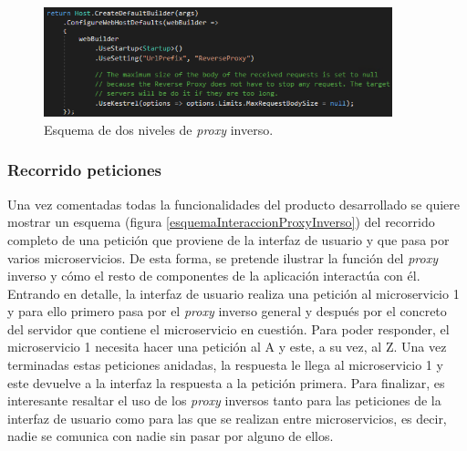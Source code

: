 \documentclass[11pt,spanish,listoffigures]{tfgetsinf}
\begin{document}
\begin{figure}[ht]
\centering
\includegraphics[width=0.9\textwidth]{imagenes/configuracionKestrel}
\caption{Esquema de dos niveles de \emph{proxy} inverso.}
	\label{configuracionKestrel}
\end{figure}


			\subsubsection{Recorrido peticiones}

Una vez comentadas todas la funcionalidades del producto desarrollado se quiere mostrar un esquema (figura \ref{esquemaInteraccionProxyInverso}) del recorrido completo de una petición que proviene de la interfaz de usuario y que pasa por varios microservicios. De esta forma, se pretende ilustrar la función del \emph{proxy} inverso y cómo el resto de componentes de la aplicación interactúa con él. Entrando en detalle, la interfaz de usuario realiza una petición al microservicio 1 y para ello primero pasa por el \emph{proxy} inverso general y después por el concreto del servidor que contiene el microservicio en cuestión. Para poder responder, el microservicio 1 necesita hacer una petición al A y este, a su vez, al Z. Una vez terminadas estas peticiones anidadas, la respuesta le llega al microservicio 1 y este devuelve a la interfaz la respuesta a la petición primera. Para finalizar, es interesante resaltar el uso de los \emph{proxy} inversos tanto para las peticiones de la interfaz de usuario como para las que se realizan entre microservicios, es decir, nadie se comunica con nadie sin pasar por alguno de ellos.
\end{document}
